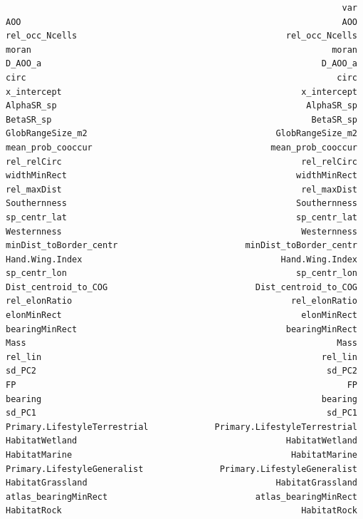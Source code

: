 \documentclass[
  letterpaper,
  DIV=11,
  numbers=noendperiod]{scrartcl}
\begin{document}
\begin{verbatim}
                                                                  var
AOO                                                               AOO
rel_occ_Ncells                                         rel_occ_Ncells
moran                                                           moran
D_AOO_a                                                       D_AOO_a
circ                                                             circ
x_intercept                                               x_intercept
AlphaSR_sp                                                 AlphaSR_sp
BetaSR_sp                                                   BetaSR_sp
GlobRangeSize_m2                                     GlobRangeSize_m2
mean_prob_cooccur                                   mean_prob_cooccur
rel_relCirc                                               rel_relCirc
widthMinRect                                             widthMinRect
rel_maxDist                                               rel_maxDist
Southernness                                             Southernness
sp_centr_lat                                             sp_centr_lat
Westernness                                               Westernness
minDist_toBorder_centr                         minDist_toBorder_centr
Hand.Wing.Index                                       Hand.Wing.Index
sp_centr_lon                                             sp_centr_lon
Dist_centroid_to_COG                             Dist_centroid_to_COG
rel_elonRatio                                           rel_elonRatio
elonMinRect                                               elonMinRect
bearingMinRect                                         bearingMinRect
Mass                                                             Mass
rel_lin                                                       rel_lin
sd_PC2                                                         sd_PC2
FP                                                                 FP
bearing                                                       bearing
sd_PC1                                                         sd_PC1
Primary.LifestyleTerrestrial             Primary.LifestyleTerrestrial
HabitatWetland                                         HabitatWetland
HabitatMarine                                           HabitatMarine
Primary.LifestyleGeneralist               Primary.LifestyleGeneralist
HabitatGrassland                                     HabitatGrassland
atlas_bearingMinRect                             atlas_bearingMinRect
HabitatRock                                               HabitatRock

\end{verbatim}
\end{document}
